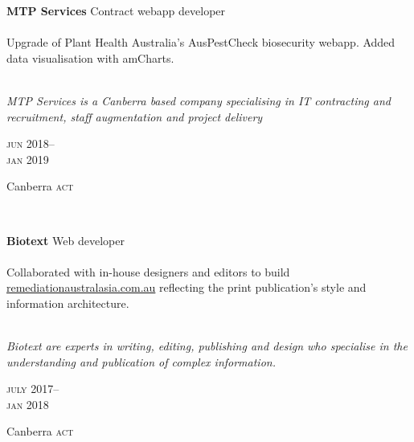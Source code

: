 \begin{minipage}[t]{\mainboxwidth\textwidth}
\textbf{MTP Services}\phantom{..} Contract webapp developer\\
\\
Upgrade of Plant Health Australia's AusPestCheck biosecurity webapp. Added 
data visualisation with amCharts.
\\
\\
{\small
\textit{MTP Services is a Canberra based company specialising in IT contracting and recruitment, staff augmentation and project delivery} 
\par}
\end{minipage}
\begin{minipage}[t]{\detailboxwidth\textwidth}
{
\hfill \textsc{jun} 2018--\\ 
\hspace*{0pt} \hfill \textsc{jan} 2019
\par
{\small\hfill Canberra \textsc{act}}
}
\end{minipage}
\\

\begin{minipage}[t]{\mainboxwidth\textwidth}
\textbf{Biotext}\phantom{..} Web developer\\
\\
Collaborated with in-house designers and editors to build 
\href{https://www.remediationaustralasia.com.au/}{remediationaustralasia.com.au} 
reflecting the print publication's style and information architecture.
\\
\\
{\small
\textit{
Biotext are experts in writing, editing, publishing and design who specialise
in the understanding and publication of complex information.}
\par}
\end{minipage}
\begin{minipage}[t]{\detailboxwidth\textwidth}
{
\hfill \textsc{july} 2017--\\ 
\hspace*{0pt} \hfill \textsc{jan} 2018
\par
{\small\hfill Canberra \textsc{act}}
}
\end{minipage}
\\

